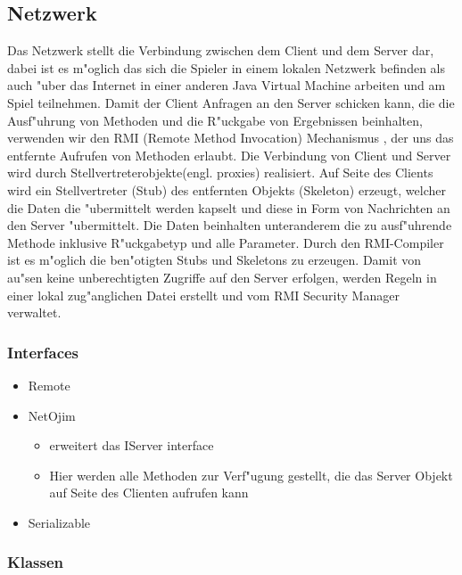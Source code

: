 \documentclass[a4paper,10pt]{article}
\begin{document}
\subsection{Netzwerk}
Das Netzwerk stellt die Verbindung zwischen dem Client und dem Server dar, dabei ist es m"oglich das sich die Spieler in einem lokalen
Netzwerk befinden als auch "uber das Internet in einer anderen Java Virtual Machine arbeiten und am Spiel teilnehmen. Damit der Client Anfragen an den Server schicken kann, die die Ausf"uhrung von Methoden und die R"uckgabe von Ergebnissen beinhalten, verwenden wir den RMI (Remote Method Invocation) Mechanismus , der uns das entfernte Aufrufen von Methoden erlaubt. Die Verbindung von Client und Server wird durch Stellvertreterobjekte(engl. proxies) realisiert. Auf Seite des Clients wird ein Stellvertreter (Stub) des entfernten Objekts (Skeleton) erzeugt, welcher die Daten die "ubermittelt werden kapselt und diese in Form von Nachrichten an den Server "ubermittelt. Die Daten beinhalten unteranderem die zu ausf"uhrende Methode inklusive R"uckgabetyp und alle Parameter. Durch den RMI-Compiler ist es m"oglich die ben"otigten Stubs und Skeletons zu erzeugen. Damit von au"sen keine unberechtigten Zugriffe auf den Server erfolgen, werden Regeln in einer lokal zug"anglichen Datei erstellt und vom RMI Security Manager verwaltet.    
  
\subsubsection{Interfaces}
\begin{itemize}
\item Remote
\item NetOjim
\begin{itemize}
\item erweitert das IServer interface 
\item Hier werden alle Methoden zur Verf"ugung gestellt, die das Server Objekt auf Seite des Clienten aufrufen kann
\end{itemize}
\item Serializable
\end{itemize}
\subsubsection{Klassen}
\end{document}
